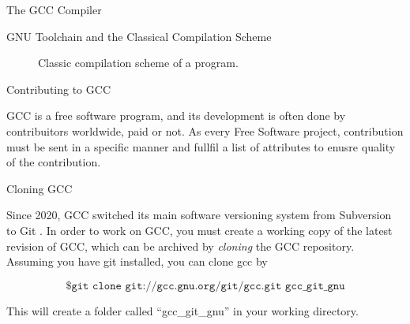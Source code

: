 \begin{section}{The GCC Compiler}
\begin{subsection}{GNU Toolchain and the Classical Compilation Scheme}
\begin{figure}
\begin{center}
{
}
\end{center}
\caption{Classic compilation scheme of a program.}
\label{fig:classical_build}
\end{figure}

\end{subsection}

\begin{section}{Contributing to GCC}

GCC is a free software program, and its development is often done by
contribuitors worldwide, paid or not. As every Free Software project,
contribution must be sent in a specific manner and fullfil a list
of attributes to enusre quality of the contribution.

\begin{subsection}{Cloning GCC}

Since 2020, GCC switched its main software versioning system from Subversion
to Git \citep{gcc_git}. In order to work on GCC, you must create a working
copy of the latest revision of GCC, which can be archived by \textit{cloning}
the GCC repository. Assuming you have git installed, you can clone
gcc by

$$\texttt{\$ git clone git://gcc.gnu.org/git/gcc.git gcc\_git\_gnu}$$

This will create a folder called ``gcc\_git\_gnu'' in your working directory.


\end{subsection}
\end{section}
\end{section}
